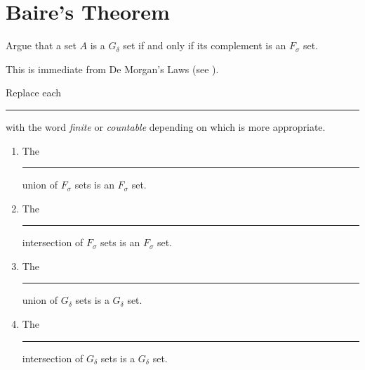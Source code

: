 \documentclass{lew98_solutions}
\begin{document}
\section{Baire's Theorem}
\label{sec:3.5}

\begin{exercise}
\label{ex:3.5.1}
    Argue that a set \( A \) is a \( G_{\delta} \) set if and only if its complement is an \( F_{\sigma} \) set.
\end{exercise}

\begin{solution}
    This is immediate from De Morgan's Laws (see ).
\end{solution}

\begin{exercise}
\label{ex:3.5.2}
    Replace each \rule{1cm}{0.15mm} with the word \textit{finite} or \textit{countable} depending on which is more appropriate.
    \begin{enumerate}
        \item The \rule{1cm}{0.15mm} union of \( F_{\sigma} \) sets is an \( F_{\sigma} \) set.

        \item The \rule{1cm}{0.15mm} intersection of \( F_{\sigma} \) sets is an \( F_{\sigma} \) set.

        \item The \rule{1cm}{0.15mm} union of \( G_{\delta} \) sets is a \( G_{\delta} \) set.

        \item The \rule{1cm}{0.15mm} intersection of \( G_{\delta} \) sets is a \( G_{\delta} \) set.
    \end{enumerate}
\end{exercise}
\end{document}
